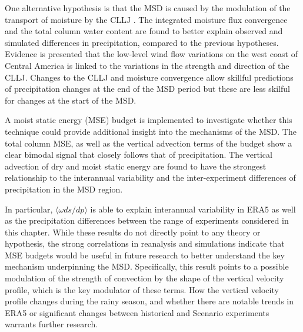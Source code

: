 One alternative hypothesis is that the MSD is caused by the modulation of the transport of moisture by the CLLJ \citep{herrera2015,zermeno2019,martinez2019}. The integrated moisture flux convergence and the total column water content are found to better explain observed and simulated differences in precipitation, compared to the previous hypotheses. Evidence is presented that the low-level wind flow variations on the west coast of Central America is linked to the variations in the strength and direction of the CLLJ. 
Changes to the CLLJ and moisture convergence allow skillful predictions of precipitation changes at the end of the MSD period but these are less skilful for changes at the start of the MSD. 

A moist static energy (MSE) budget is implemented to investigate whether this technique could provide additional insight into the mechanisms of the MSD. The total column MSE, as well as the vertical advection terms of the budget show a clear bimodal signal that closely follows that of precipitation. The vertical advection of dry and moist static energy are found to have the strongest relationship to the interannual variability and the inter-experiment differences of precipitation in the MSD region. 

In particular, $\langle \omega ds/dp \rangle$ is able to explain interannual variability in ERA5 as well as the precipitation differences between the range of experiments considered in this chapter. While these results do not directly point to any theory or hypothesis, the strong correlations in reanalysis and simulations indicate that MSE budgets would be useful in future research to better understand the key mechanism underpinning the MSD. Specifically, this result points to a possible modulation of the strength of convection by the shape of the vertical velocity profile, which is the key modulator of these terms. How the vertical velocity profile changes during the rainy season, and whether there are notable trends in ERA5 or significant changes between historical and Scenario experiments warrants further research.
 
 
